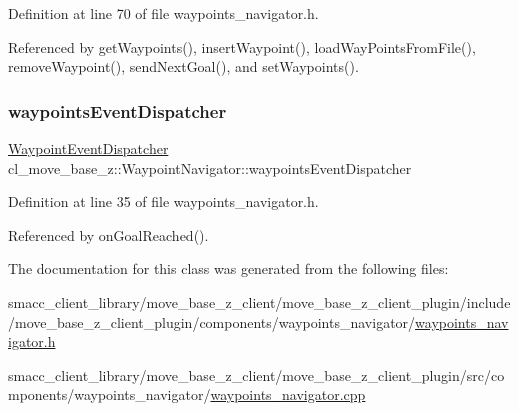 Definition at line 70 of file waypoints\+\_\+navigator.\+h.



Referenced by get\+Waypoints(), insert\+Waypoint(), load\+Way\+Points\+From\+File(), remove\+Waypoint(), send\+Next\+Goal(), and set\+Waypoints().

\mbox{\label{classcl__move__base__z_1_1WaypointNavigator_a4f2be7a9741e8535c414e63335d752a0}} 
\subsubsection{\texorpdfstring{waypoints\+Event\+Dispatcher}{waypointsEventDispatcher}}
{\footnotesize\ttfamily \hyperlink{classcl__move__base__z_1_1WaypointEventDispatcher}{Waypoint\+Event\+Dispatcher} cl\+\_\+move\+\_\+base\+\_\+z\+::\+Waypoint\+Navigator\+::waypoints\+Event\+Dispatcher}



Definition at line 35 of file waypoints\+\_\+navigator.\+h.



Referenced by on\+Goal\+Reached().



The documentation for this class was generated from the following files\+:\begin{DoxyCompactItemize}
\item 
smacc\+\_\+client\+\_\+library/move\+\_\+base\+\_\+z\+\_\+client/move\+\_\+base\+\_\+z\+\_\+client\+\_\+plugin/include/move\+\_\+base\+\_\+z\+\_\+client\+\_\+plugin/components/waypoints\+\_\+navigator/\hyperlink{waypoints__navigator_8h}{waypoints\+\_\+navigator.\+h}\item 
smacc\+\_\+client\+\_\+library/move\+\_\+base\+\_\+z\+\_\+client/move\+\_\+base\+\_\+z\+\_\+client\+\_\+plugin/src/components/waypoints\+\_\+navigator/\hyperlink{waypoints__navigator_8cpp}{waypoints\+\_\+navigator.\+cpp}\end{DoxyCompactItemize}
